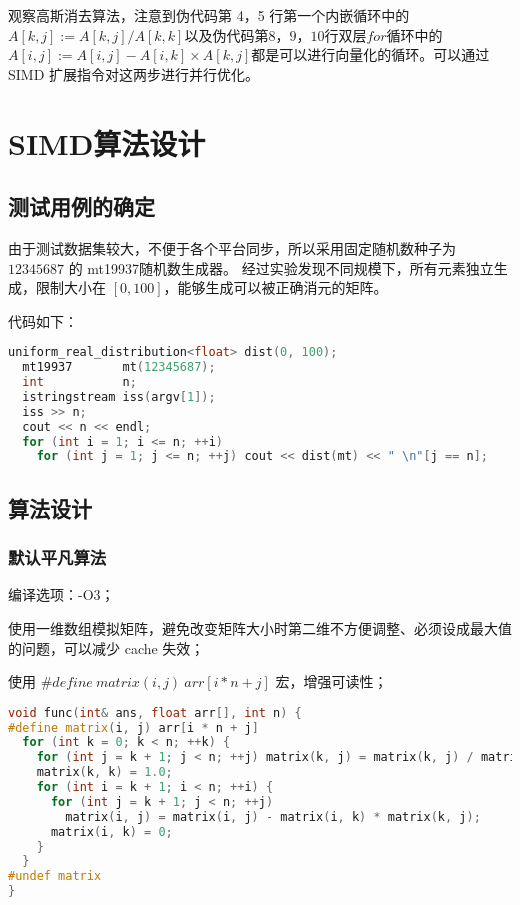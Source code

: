 \documentclass[a4paper]{article}
\begin{document}
观察高斯消去算法，注意到伪代码第 4，5 行第一个内嵌循环中的$A[k, j] := A[k, j]/A[k, k]$以及伪代码第$8，9，10$行双层$for$循环中的$A[i, j] := A[i, j] − A[i, k]×A[k, j]$都是可以进行向量化的循环。可以通过SIMD 扩展指令对这两步进行并行优化。

\section{SIMD算法设计}

\subsection{测试用例的确定}

由于测试数据集较大，不便于各个平台同步，所以采用固定随机数种子为 $12345687$ 的 mt19937随机数生成器。
经过实验发现不同规模下，所有元素独立生成，限制大小在 $[0, 100]$，能够生成可以被正确消元的矩阵。

代码如下：

\begin{lstlisting}[title=测试数据集生成器,frame=trbl,language={C++}]
  uniform_real_distribution<float> dist(0, 100);
  mt19937       mt(12345687);
  int           n;
  istringstream iss(argv[1]);
  iss >> n;
  cout << n << endl;
  for (int i = 1; i <= n; ++i)
    for (int j = 1; j <= n; ++j) cout << dist(mt) << " \n"[j == n];
\end{lstlisting}

\subsection{算法设计}

\subsubsection{默认平凡算法}

编译选项：-O3；

使用一维数组模拟矩阵，避免改变矩阵大小时第二维不方便调整、必须设成最大值的问题，可以减少 cache 失效；

使用 $\#define\ matrix(i, j)\ arr[i * n + j]$ 宏，增强可读性；

\begin{lstlisting}[title=平凡算法,frame=trbl,language={C++}]
void func(int& ans, float arr[], int n) {
#define matrix(i, j) arr[i * n + j]
  for (int k = 0; k < n; ++k) {
    for (int j = k + 1; j < n; ++j) matrix(k, j) = matrix(k, j) / matrix(k, k);
    matrix(k, k) = 1.0;
    for (int i = k + 1; i < n; ++i) {
      for (int j = k + 1; j < n; ++j)
        matrix(i, j) = matrix(i, j) - matrix(i, k) * matrix(k, j);
      matrix(i, k) = 0;
    }
  }
#undef matrix
}
\end{lstlisting}
\end{document}

